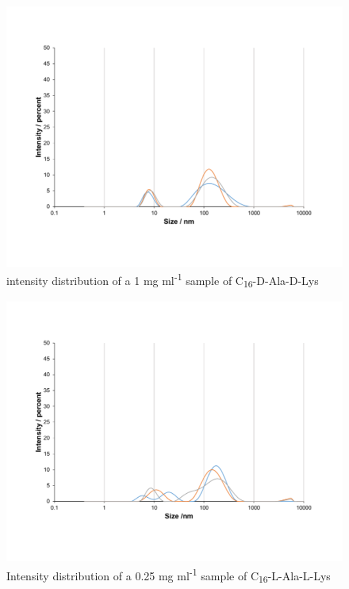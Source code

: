 \begin{figure} [ht!]
\centering
\includegraphics[scale=0.47]{DLS/KAT1_35_1_0mg_ml-1_size.pdf}
\caption{intensity distribution of a 1 mg ml\textsuperscript{-1} sample of C\textsubscript{16}-D-Ala-D-Lys}
\label{intensity_1.0_KAT1.35}
\end{figure}

\begin{figure} [ht!]
\centering
\includegraphics[scale=0.47]{DLS/KAT1_19_0_25mg_ml-1_size.pdf}
\caption{Intensity distribution of a 0.25 mg ml\textsuperscript{-1} sample of C\textsubscript{16}-L-Ala-L-Lys}
\label{intensity_0.25_KAT1.19}
\end{figure}

